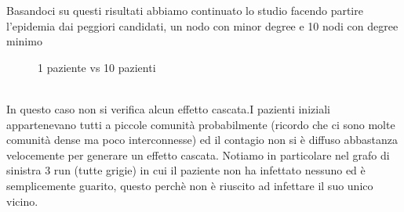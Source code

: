 \documentclass[a4paper]{article}
\begin{document}
Basandoci su questi risultati abbiamo continuato lo studio facendo partire l'epidemia dai peggiori candidati, un nodo con minor degree e 10 nodi con degree minimo\\
\begin{figure}[!ht]
\centering
{}
\caption{1 paziente vs 10 pazienti} \label{FIG:bad_diffusion}
\end{figure}\\
In questo caso non si verifica alcun effetto cascata.I pazienti iniziali appartenevano tutti a piccole comunità probabilmente (ricordo che ci sono molte comunità dense ma poco interconnesse) ed il contagio non si è diffuso abbastanza velocemente per generare un effetto cascata. Notiamo in particolare nel grafo di sinistra 3 run (tutte grigie) in cui il paziente non ha infettato nessuno ed è semplicemente guarito, questo perchè non è riuscito ad infettare il suo unico vicino.
\end{document}
